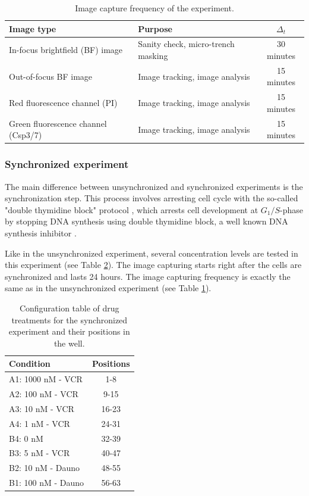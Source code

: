 \documentclass[pdftex,12pt,a4paper]{report}
\begin{document}
\begin{table}[H]
\centering
\begin{tabular}{| l | l | c |}
\hline
Image type & Purpose & $\Delta_t$ \\
\hline
In-focus brightfield (BF) image & Sanity check, micro-trench masking & 30 minutes \\
Out-of-focus BF image & Image tracking, image analysis & 15 minutes \\
Red fluorescence channel (PI)& Image tracking, image analysis & 15 minutes \\
Green fluorescence channel (Csp3/7) & Image tracking, image analysis & 15 minutes \\
\hline
\end{tabular}
\caption{Image capture frequency of the experiment.}
\label{table:image_capture_frequency}
\end{table}


\subsubsection{Synchronized experiment}
\label{subsection:synchronized_experiment}

The main difference between unsynchronized and synchronized experiments is the synchronization step. This process involves arresting cell cycle with the so-called "double thymidine block" protocol \cite{harper2005synchronization}, which arrests cell development at $G_1/S$-phase by stopping DNA synthesis using double thymidine block, a well known DNA synthesis inhibitor \cite{bostock1971evaluation}.

Like in the unsynchronized experiment, several concentration levels are tested in this experiment (see Table \ref{table:syn_treatments}). The image capturing starts right after the cells are synchronized and lasts 24 hours. The image capturing frequency is exactly the same as in the unsynchronized experiment (see Table \ref{table:image_capture_frequency}).

\begin{table}[H]
\centering
\begin{tabular}{| l | c |}
\hline
Condition & Positions \\
\hline
A1: 1000 nM - VCR & 1-8 \\
A2: 100 nM - VCR & 9-15 \\
A3: 10 nM - VCR & 16-23 \\
A4: 1 nM - VCR & 24-31 \\
B4: 0 nM & 32-39 \\
B3: 5 nM - VCR & 40-47 \\
B2: 10 nM - Dauno & 48-55 \\
B1: 100 nM - Dauno & 56-63 \\
\hline
\end{tabular}
\caption{Configuration table of drug treatments for the synchronized experiment and their positions in the well.}
\label{table:syn_treatments}
\end{table}
\end{document}
